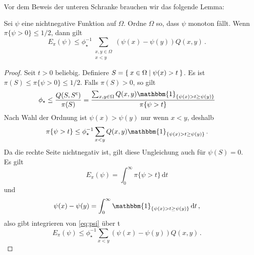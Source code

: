 \documentclass[ngerman,a4paper,11pt]{scrartcl}
\newcommand{\stcomp}[1]{{#1}^{\mathsf{c}}} %
\begin{document}
Vor dem Beweis der unteren Schranke brauchen wir das folgende Lemma:
\begin{lem}
 \label{lem:ordn}
 Sei $\psi$ eine nichtnegative Funktion auf $\Omega$. Ordne $\Omega$ so, dass
 $\psi$ monoton fällt. Wenn $\pi\{\psi>0\}\leq 1/2$, dann gilt
 \begin{equation*}
  E_\pi(\psi)\leq\phi_\star^{-1}\sum_{\substack{x,y\in\Omega\\x<y}}(\psi(x)-\psi(y))Q(x,y)\, .
 \end{equation*}
\end{lem}
\begin{proof}
 Seit $t>0$ beliebig. Definiere $S=\Set{x\in\Omega\mid \psi(x)>t}$. Es ist
 ${\pi(S)\leq\pi\{\psi>0\}\leq 1/2}$. Falls $\pi(S)>0$, so gilt
 \begin{equation*}
  \phi_\star\leq\frac{Q(S,\stcomp{S})}{\pi(S)}=\frac{\sum_{x,y\in\Omega}Q(x,y)\mathbbm{1}_{\{\psi(x)>t\geq\psi(y)\}}}{\pi\{\psi>t\}} 
 \end{equation*}
 Nach Wahl der Ordnung ist $\psi(x)>\psi(y)$ nur wenn $x<y$, deshalb
 \begin{equation}
  \label{eq:psi}
  \pi\{\psi>t\}\leq\phi_\star^{-1}\sum_{x<y}Q(x,y)\mathbbm{1}_{\{\psi(x)>t\geq\psi(y)\}}\, .
 \end{equation}
 Da die rechte Seite nichtnegativ ist, gilt diese Ungleichung auch für
 $\psi(S)=0$. Es gilt
 \begin{equation*}
  E_\pi(\psi)=\int_0^\infty\pi\{\psi>t\}\,\mathrm{d}t
 \end{equation*}
 und
 \begin{equation*}
  \psi(x)-\psi(y)=\int_0^\infty\mathbbm{1}_{\{\psi(x)>t\geq\psi(y)\}}\,\mathrm{d}t\, ,
 \end{equation*}
 also gibt integrieren von \cref{eq:psi} über t
 \begin{equation*}
  E_\pi(\psi)\leq\phi_\star^{-1}\sum_{x<y}(\psi(x)-\psi(y))Q(x,y)\, .
 \end{equation*}
\end{proof}
\end{document}
